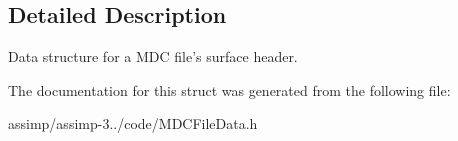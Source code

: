 \subsection{Detailed Description}
Data structure for a M\+D\+C file's surface header. 

The documentation for this struct was generated from the following file\+:\begin{DoxyCompactItemize}
\item 
assimp/assimp-\/3../code/M\+D\+C\+File\+Data.\+h\end{DoxyCompactItemize}

